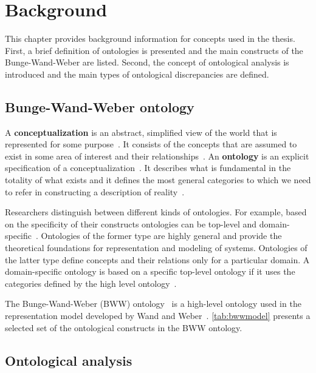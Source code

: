 \chapter{Background}
\label{sec:background}

This chapter provides background information for concepts used in the thesis.
First, a brief definition of ontologies is presented and the main constructs
of the Bunge-Wand-Weber are listed. Second, the concept of ontological
analysis is introduced and the main types of ontological discrepancies are
defined.

\section{Bunge-Wand-Weber ontology}


A \textbf{conceptualization} is an abstract, simplified view of the world that is represented for
some purpose~\cite{gruber1995toward}. It consists of the concepts that are assumed to exist in some
area of interest and their relationships~\cite{gruber1995toward}. An \textbf{ontology} is an
explicit specification of a conceptualization~\cite{gruber1995toward}. It describes what is
fundamental in the totality of what exists and it defines the most general categories to which we
need to refer in constructing a description of reality~\cite{milton2004top}.

Researchers distinguish between different kinds of ontologies. For example,
based on the specificity of their constructs ontologies can be top-level and
domain-specific~\cite{milton2004top}. Ontologies of the former type are
highly general and provide the theoretical foundations for representation and
modeling of systems. Ontologies of the latter type define concepts and their
relations only for a particular domain. A domain-specific ontology is based on
a specific top-level ontology if it uses the categories defined by the high
level ontology~\cite{milton2004top}.

The Bunge-Wand-Weber (BWW) ontology~\cite{wand1990ontological} is a high-level ontology used in the
representation model developed by Wand and Weber~\cite{wand1995deep}. \autoref{tab:bwwmodel}
presents a selected set of the ontological constructs in the BWW ontology.

\section{Ontological analysis}

